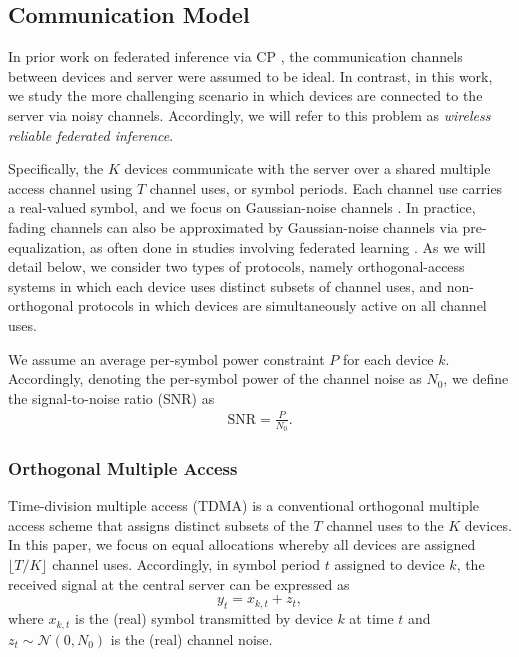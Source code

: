 \documentclass[12pt, draftclsnofoot, onecolumn]{IEEEtran}
\begin{document}
\subsection{Communication Model}\label{subsec:protocols_tdma_tbma}
In prior work on federated inference via CP \cite{FedCP-Avg, FedCP-QQ,lu2023federated,plassier2023conformal}, the communication channels between devices and server were assumed to be ideal. In contrast, in this work, we study the more challenging scenario in which devices are connected to the server via noisy channels. Accordingly, we will refer to this problem as \emph{wireless reliable federated inference}.

Specifically, the $K$ devices communicate with the server over a shared multiple access channel using $T$ channel uses, or symbol periods. Each channel use carries a real-valued symbol, and we focus on Gaussian-noise channels \cite{amiri2020machine}. In practice, fading channels can also be approximated by Gaussian-noise channels via pre-equalization, as often done in studies involving federated learning \cite{liu2020privacy, zhu2019broadband, amiri2020machine, yang2020federated}. As we will detail below, we consider two types of protocols, namely orthogonal-access systems in which each device uses distinct subsets of channel uses, and non-orthogonal protocols in which devices are simultaneously active on all channel uses.

We assume an average per-symbol power constraint $P$ for each device $k$. Accordingly, denoting the per-symbol power of the channel noise as $N_0$, we define the signal-to-noise ratio (SNR) as 
\begin{align}\label{eq:def_SNR}
    \text{SNR} = \frac{P}{N_0}.
\end{align}

\subsubsection{Orthogonal Multiple Access} Time-division multiple access (TDMA) is a conventional orthogonal multiple access scheme that assigns distinct subsets of the $T$ channel uses to the $K$ devices. In this paper, we focus on equal allocations whereby all devices are assigned $\lfloor T/K\rfloor$ channel uses. Accordingly, in symbol period $t$ assigned to device $k$, the received signal at the central server can be expressed as
\begin{equation}\label{received_signal}
    y_t = x_{k,t} + z_t,
\end{equation}
where $x_{k,t}$ is the (real) symbol transmitted by device $k$ at time $t$ and $ z_t\sim \mathcal{N}(0,N_0)$ is the (real) channel noise.
\end{document}
